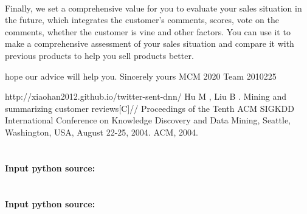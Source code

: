 \documentclass{mcmthesis}
\begin{document}
	\paragraph{}
	Finally, we set a comprehensive value for you to evaluate your sales situation in the future, which integrates the customer's comments, scores, vote on the comments, whether the customer is vine and other factors. You can use it to make a comprehensive assessment of your sales situation and compare it with previous products to help you sell products better.
	
	hope our advice will help you.
	\flushleft
	Sincerely yours
	\flushleft
	MCM 2020 Team 2010225
	
	\newpage
	
	\begin{thebibliography}{99}
		 http://xiaohan2012.github.io/twitter-sent-dnn/
		 Hu M , Liu B . Mining and summarizing customer reviews[C]// Proceedings of the Tenth ACM SIGKDD International Conference on Knowledge Discovery and Data Mining, Seattle, Washington, USA, August 22-25, 2004. ACM, 2004.
		
	\end{thebibliography}
	
	\newpage
	
	\begin{appendices}
		\section{}
		\textcolor[rgb]{0.98,0.00,0.00}{\textbf{Input python source:}}
		
		\section{}
		\textcolor[rgb]{0.98,0.00,0.00}{\textbf{Input python source:}}
		
	\end{appendices}
\end{document}
